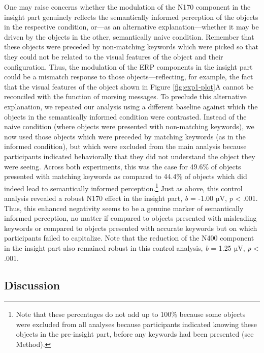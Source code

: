 \documentclass[
  english,
  doc,12pt,twoside,floatsintext]{apa7}
\begin{document}
One may raise concerns whether the modulation of the N170 component in the insight part genuinely reflects the semantically informed perception of the objects in the respective condition, or---as an alternative explanation---whether it may be driven by the objects in the other, semantically naive condition. Remember that these objects were preceded by non-matching keywords which were picked so that they could not be related to the visual features of the object and their configuration. Thus, the modulation of the ERP components in the insight part could be a mismatch response to those objects---reflecting, for example, the fact that the visual features of the object shown in Figure \ref{fig:exp1-plot}A cannot be reconciled with the function of morsing messages. To preclude this alternative explanation, we repeated our analysis using a different baseline against which the objects in the semantically informed condition were contrasted. Instead of the naive condition (where objects were presented with non-matching keywords), we now used those objects which were preceded by matching keywords (as in the informed condition), but which were excluded from the main analysis because participants indicated behaviorally that they did not understand the object they were seeing. Across both experiments, this was the case for 49.6\% of objects presented with matching keywords as compared to 44.4\% of objects which did indeed lead to semantically informed perception.\footnote{Note that these percentages do not add up to 100\% because some objects were excluded from all analyses because participants indicated knowing these objects in the pre-insight part, before any keywords had been presented (see Method).} Just as above, this control analysis revealed a robust N170 effect in the insight part, \emph{b} = -1.00 µV, \emph{p} \textless{} .001. Thus, this enhanced negativity seems to be a genuine marker of semantically informed perception, no matter if compared to objects presented with misleading keywords or compared to objects presented with accurate keywords but on which participants failed to capitalize. Note that the reduction of the N400 component in the insight part also remained robust in this control analysis, \emph{b} = 1.25 µV, \emph{p} \textless{} .001.

\hypertarget{discussion-1}{%
\subsection{Discussion}\label{discussion-1}}
\end{document}

